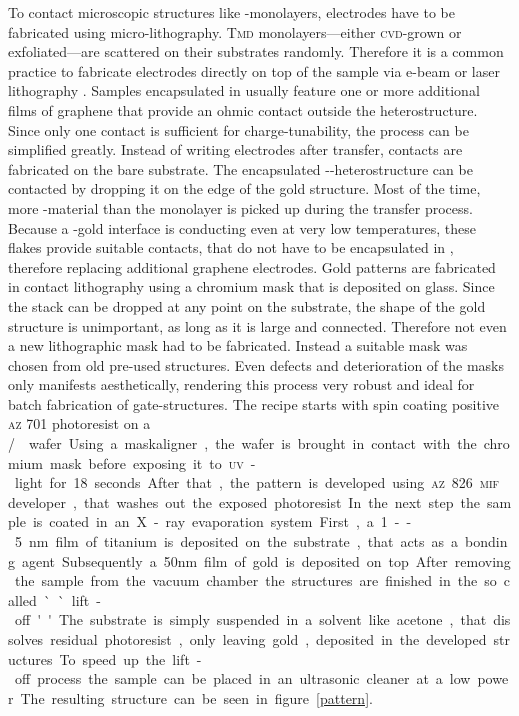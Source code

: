 To contact microscopic structures like \tmd-monolayers, electrodes have to be fabricated using micro-lithography. \textsc{Tmd} monolayers---either \textsc{cvd}-grown or exfoliated---are scattered on their substrates randomly. Therefore it is a common practice to fabricate electrodes directly on top of the sample via e-beam or laser lithography  \cite{wang_electronic_2015, fallahazad_shubnikovhaas_2016}. Samples encapsulated in \hbng usually feature one or more additional films of graphene that provide an ohmic contact outside the heterostructure. Since only one contact is sufficient for charge-tunability, the process can be simplified greatly. Instead of writing electrodes after transfer, contacts are fabricated on the bare substrate. The encapsulated \hbn-\tmd-heterostructure can be contacted by dropping it on the edge of the gold structure. Most of the time, more \tmd-material than the monolayer is picked up during the transfer process. Because a \tmd-gold interface is conducting even at very low temperatures, these flakes provide suitable contacts, that do not have to be encapsulated in \hbn, therefore replacing additional graphene electrodes. Gold patterns are fabricated in contact lithography using a chromium mask that is deposited on glass. Since the stack can be dropped at any point on the substrate, the shape of the gold structure is unimportant, as long as it is large and connected. Therefore not even a new lithographic mask had to be fabricated. Instead a suitable mask was chosen from old pre-used structures. Even defects and deterioration of the masks only manifests aesthetically, rendering this process very robust and ideal for batch fabrication of gate-structures. The recipe starts with spin coating positive \textsc{az} 701 photoresist on a \si/\sio wafer. Using a maskaligner, the wafer is brought in contact with the chromium mask before exposing it to \textsc{uv}-light for 18 seconds. After that, the pattern is developed using \textsc{az} 826 \textsc{mif} developer, that washes out the exposed photoresist.

In the next step the sample is coated in an X-ray evaporation system. First, a 1--5 nm film of titanium is deposited on the substrate, that acts as a bonding agent. Subsequently a 50nm film of gold is deposited on top. After removing the sample from the vacuum chamber the structures are finished in the so called ``lift-off''. The substrate is simply suspended in a solvent like acetone, that dissolves residual photoresist, only leaving gold, deposited in the developed structures. To speed up the lift-off process the sample can be placed in an ultrasonic cleaner at a low power. The resulting structure can be seen in figure \ref{pattern}. 

